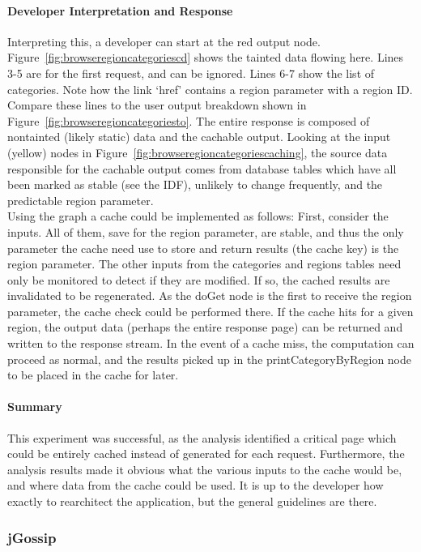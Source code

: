 \documentclass[msc,oneside]{ubcthesis}
\begin{document}
\paragraph{Developer Interpretation and Response}
Interpreting this, a developer can start at the red output node. Figure~\ref{fig:browseregioncategoriescd} shows the tainted data flowing here. Lines 3-5 are for the first request, and can be ignored. Lines 6-7 show the list of categories. Note how the link `href' contains a region parameter with a region ID. Compare these lines to the user output breakdown shown in Figure~\ref{fig:browseregioncategoriesto}. The entire response is composed of nontainted (likely static) data and the cachable output. Looking at the input (yellow) nodes in Figure~\ref{fig:browseregioncategoriescaching}, the source data responsible for the cachable output comes from database tables which have all been marked as stable (see the IDF), unlikely to change frequently, and the predictable region parameter. \\

Using the graph a cache could be implemented as follows: First, consider the inputs. All of them, save for the region parameter, are stable, and thus the only parameter the cache need use to store and return results (the cache key) is the region parameter. The other inputs from the categories and regions tables need only be monitored to detect if they are modified. If so, the cached results are invalidated to be regenerated. As the doGet node is the first to receive the region parameter, the cache check could be performed there. If the cache hits for a given region, the output data (perhaps the entire response page) can be returned and written to the response stream. In the event of a cache miss, the computation can proceed as normal, and the results picked up in the printCategoryByRegion node to be placed in the cache for later.

\paragraph{Summary}
This experiment was successful, as the analysis identified a critical page which could be entirely cached instead of generated for each request. Furthermore, the analysis results made it obvious what the various inputs to the cache would be, and where data from the cache could be used. It is up to the developer how exactly to rearchitect the application, but the general guidelines are there.

\subsubsection{jGossip} 
\end{document}
